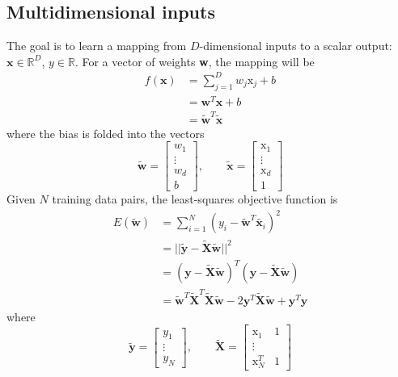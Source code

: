 \documentclass[11pt]{article}
\theoremstyle{plain}
\theoremstyle{definition}
\begin{document}
\subsection{Multidimensional inputs}
The goal is to learn a mapping from $D$-dimensional inputs to a scalar output: $\textbf{x} \in \mathbb{R}^D$, $y \in \mathbb{R}$. For a vector of weights \textbf{w}, the mapping will be
\begin{align}
f\left(\textbf{x}\right) &= \sum_{j=1}^D w_j\text{x}_j +b \nonumber \\
&= \textbf{w}^T\textbf{x} + b \nonumber \\
&=\tilde{\textbf{w}}^T \tilde{\textbf{x}}
\end{align}
where the bias is folded into the vectors
\begin{equation}
\tilde{\textbf{w}} = \begin{bmatrix}
	w_1 \\
	\vdots \\
	w_d\\
	b	
	\end{bmatrix}, \qquad \tilde{\textbf{x}} = \begin{bmatrix}
	\text{x}_1 \\
	\vdots \\
	\text{x}_d\\
	1	
	\end{bmatrix}
\end{equation}
Given $N$ training data pairs, the least-squares objective function is
\begin{align}
E\left(\tilde{\textbf{w}}\right) &= \sum_{i=1}^N \left(y_i - \tilde{\textbf{w}}^T \tilde{\textbf{x}_i} \right)^2 \nonumber \\
 &= ||\tilde{\textbf{y}} - \tilde{\textbf{X}}\tilde{\textbf{w}} ||^2 \nonumber \\
&= (\textbf{y} -  \tilde{\textbf{X}} \tilde{\textbf{w}} )^T (\textbf{y} -  \tilde{\textbf{X}} \tilde{\textbf{w}} ) \nonumber \\
&= \tilde{\textbf{w}}^T \tilde{\textbf{X}}^T \tilde{\textbf{X}} \tilde{\textbf{w}} -2 \textbf{y}^T\tilde{\textbf{X}}\tilde{\textbf{w}} + \textbf{y}^T \textbf{y}
\end{align}
where
\begin{equation}
\tilde{\textbf{y}} = \begin{bmatrix}
y_1 \\
\vdots \\
y_N	
\end{bmatrix}, \qquad \tilde{\textbf{X}} = \begin{bmatrix}
\text{x}_1 & 1\\
\vdots \\
\text{x}_N^T & 1	
\end{bmatrix}
\end{equation}
\end{document}
